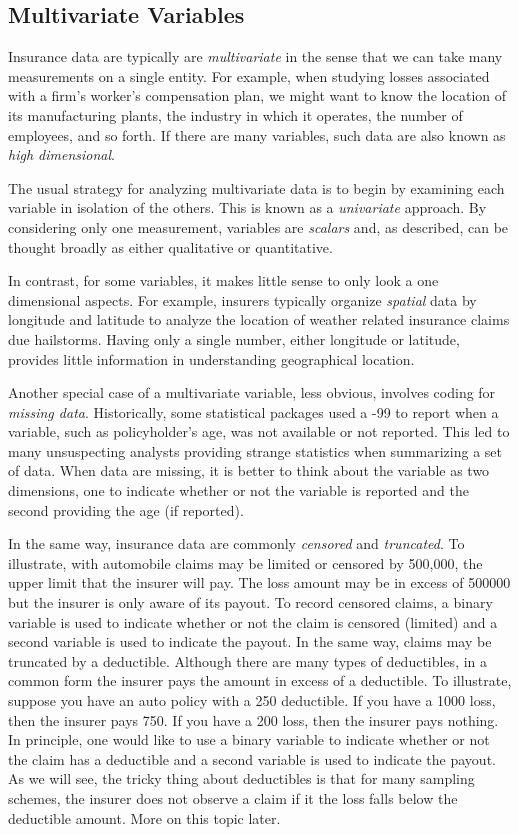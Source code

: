 \documentclass[]{book}
\begin{document}
\subsection{Multivariate Variables}\label{multivariate-variables}

Insurance data are typically are \emph{multivariate} in the sense that
we can take many measurements on a single entity. For example, when
studying losses associated with a firm's worker's compensation plan, we
might want to know the location of its manufacturing plants, the
industry in which it operates, the number of employees, and so forth. If
there are many variables, such data are also known as \emph{high
dimensional}.

The usual strategy for analyzing multivariate data is to begin by
examining each variable in isolation of the others. This is known as a
\emph{univariate} approach. By considering only one measurement,
variables are \emph{scalars} and, as described, can be thought broadly
as either qualitative or quantitative.

In contrast, for some variables, it makes little sense to only look a
one dimensional aspects. For example, insurers typically organize
\emph{spatial} data by longitude and latitude to analyze the location of
weather related insurance claims due hailstorms. Having only a single
number, either longitude or latitude, provides little information in
understanding geographical location.

Another special case of a multivariate variable, less obvious, involves
coding for \emph{missing data}. Historically, some statistical packages
used a -99 to report when a variable, such as policyholder's age, was
not available or not reported. This led to many unsuspecting analysts
providing strange statistics when summarizing a set of data. When data
are missing, it is better to think about the variable as two dimensions,
one to indicate whether or not the variable is reported and the second
providing the age (if reported).

In the same way, insurance data are commonly \emph{censored} and
\emph{truncated}. To illustrate, with automobile claims may be limited
or censored by 500,000, the upper limit that the insurer will pay. The
loss amount may be in excess of 500000 but the insurer is only aware of
its payout. To record censored claims, a binary variable is used to
indicate whether or not the claim is censored (limited) and a second
variable is used to indicate the payout. In the same way, claims may be
truncated by a deductible. Although there are many types of deductibles,
in a common form the insurer pays the amount in excess of a deductible.
To illustrate, suppose you have an auto policy with a 250 deductible. If
you have a 1000 loss, then the insurer pays 750. If you have a 200 loss,
then the insurer pays nothing. In principle, one would like to use a
binary variable to indicate whether or not the claim has a deductible
and a second variable is used to indicate the payout. As we will see,
the tricky thing about deductibles is that for many sampling schemes,
the insurer does not observe a claim if it the loss falls below the
deductible amount. More on this topic later.
\end{document}
